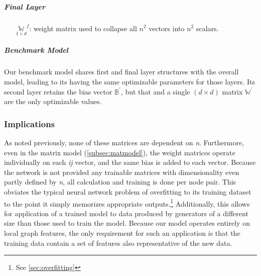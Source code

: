 \subparagraph{Final Layer}
\begin{itemize}
	\item[$\underset{1 \times d}{\mathbb{W}}^f$:] weight matrix used to collapse 
		all $n^2$ vectors into $n^2$ scalars.
\end{itemize}

\subparagraph{Benchmark Model}
Our benchmark model shares first and final layer structures with the overall 
model, leading to its having the same optimizable parameters for those layers.  
Its second layer retains the bias vector $\mathbb{B}^\prime$, but that and a 
single $(d \times d)$ matrix $\mathbb{W}^\prime$ are the only optimizable 
values.


\subsubsection{Implications}
As noted previously, none of these matrices are dependent on \textit{n}.  
Furthermore, even in the matrix model (\ref{subsec:matmodel}), the weight 
matrices operate individually on each \textit{ij} vector, and the same bias is 
added to each vector.  Because the network is not provided any trainable 
matrices with dimensionality even partly defined by \textit{n}, all calculation 
and training is done per node pair.  This obviates the typical neural network 
problem of overfitting to its training dataset to the point it simply memorizes 
appropriate outputs.\footnote{See \ref{sec:overfitting}} Additionally, this 
allows for application of a trained model to data produced by generators of a 
different size than those used to train the model. Because our model operates 
entirely on local graph features, the only requirement for such an application 
is that the training data contain a set of features also representative of the 
new data.
